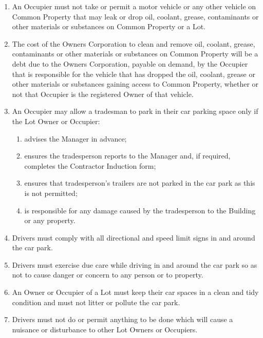 \documentclass{article}
\begin{document}
\begin{enumerate}[label=\arabic*.]
\begin{enumerate}[label=\arabic{enumi}.\arabic*.]
\begin{enumerate}[label=(\arabic*)]
\begin{enumerate}[label=(\arabic*)]
\item  An Occupier must not take or permit a motor vehicle or any other vehicle on Common Property that may leak or drop oil, coolant, grease, contaminants or other materials or substances on Common Property or a Lot.

\item  The cost of the Owners Corporation to clean and remove oil, coolant, grease, contaminants or other materials or substances on Common Property will be a debt due to the Owners Corporation, payable on demand, by the Occupier that is responsible for the vehicle that has dropped the oil, coolant, grease or other materials or substances gaining access to Common Property, whether or not that Occupier is the registered Owner of that vehicle.

\item  An Occupier may allow a tradesman to park in their car parking space only if the Lot Owner or Occupier:

\begin{enumerate}[label=(\alph*)]

\item  advises the Manager in advance;

\item  ensures the tradesperson reports to the Manager and, if required, completes the Contractor Induction form;

\item  ensures that tradesperson’s trailers are not parked in the car park as this is not permitted;

\item  is responsible for any damage caused by the tradesperson to the Building or any property.

\end{enumerate}

\item  Drivers must comply with all directional and speed limit signs in and around the car park.

\item  Drivers must exercise due care while driving in and around the car park so as not to cause danger or concern to any person or to property.

\item  An Owner or Occupier of a Lot must keep their car spaces in a clean and tidy condition and must not litter or pollute the car park.

\item  Drivers must not do or permit anything to be done which will cause a nuisance or disturbance to other Lot Owners or Occupiers.


\end{enumerate}
\end{enumerate}
\end{enumerate}
\end{enumerate}
\end{document}
